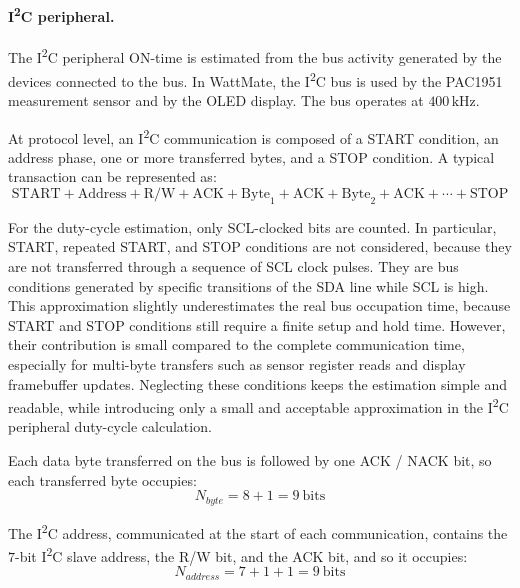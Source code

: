 \paragraph{I\textsuperscript{2}C peripheral.}
The I\textsuperscript{2}C peripheral ON-time is estimated from the bus activity generated by the devices connected to the bus. 
In WattMate, the I\textsuperscript{2}C bus is used by the PAC1951 measurement sensor and by the OLED display. 
The bus operates at \(400\,\mathrm{kHz}\).

At protocol level, an I\textsuperscript{2}C communication is composed of a START condition, an address phase, one or more transferred bytes, and a STOP condition. 
A typical transaction can be represented as:
\begin{equation}
	\text{START} + \text{Address} + \text{R/W} + \text{ACK} + \text{Byte}_1 + \text{ACK} + \text{Byte}_2 + \text{ACK} + \cdots + \text{STOP}
\end{equation}

For the duty-cycle estimation, only SCL-clocked bits are counted. 
In particular, START, repeated START, and STOP conditions are not considered, because they are not transferred through a sequence of SCL clock pulses. 
They are bus conditions generated by specific transitions of the SDA line while SCL is high. 
This approximation slightly underestimates the real bus occupation time, because START and STOP conditions still require a finite setup and hold time. 
However, their contribution is small compared to the complete communication time, especially for multi-byte transfers such as sensor register reads and display framebuffer updates. 
Neglecting these conditions keeps the estimation simple and readable, while introducing only a small and acceptable approximation in the I\textsuperscript{2}C peripheral duty-cycle calculation.

Each data byte transferred on the bus is followed by one ACK / NACK bit, so each transferred byte occupies:
\begin{equation}
	N_{byte} = 8 + 1 = 9 \ \mathrm{bits}
\end{equation}

The I\textsuperscript{2}C address, communicated at the start of each communication, contains the \(7\)-bit I\textsuperscript{2}C slave address, the R/W bit, and the ACK bit, and so it occupies:
\begin{equation}
	N_{address} = 7 + 1 + 1 = 9 \ \mathrm{bits}
\end{equation}

